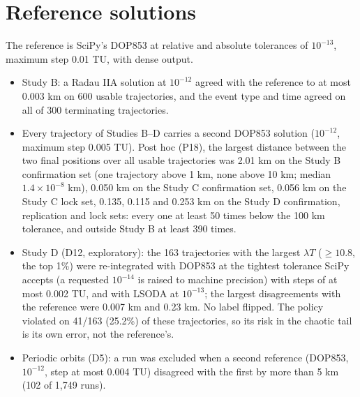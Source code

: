 \documentclass[10pt,letterpaper]{article}
\begin{document}
\section{Reference solutions}
\label{sec:refs}
The reference is SciPy's DOP853 at relative and absolute tolerances of $10^{-13}$, maximum step 0.01 TU, with dense output.
\begin{itemize}
\item Study B: a Radau IIA solution at $10^{-12}$ agreed with the reference to at most 0.003 km on 600 usable trajectories, and the event type and
time agreed on all of 300 terminating trajectories.
\item Every trajectory of Studies B--D carries a second DOP853 solution ($10^{-12}$, maximum step 0.005 TU). Post hoc (P18), the largest distance
between the two final positions over all usable trajectories was 2.01 km on the Study B confirmation set (one trajectory above 1 km, none above
10 km; median $1.4\times10^{-8}$ km), 0.050 km on the Study C confirmation set, 0.056 km on the Study C lock set, 0.135, 0.115 and 0.253 km on the
Study D confirmation, replication and lock sets: every one at least 50 times below the 100 km tolerance, and outside Study B at least 390 times.
\item Study D (D12, exploratory): the 163 trajectories with the largest $\lambda T$ ($\ge 10.8$, the top 1\%) were re-integrated with DOP853 at the
tightest tolerance SciPy accepts (a requested $10^{-14}$ is raised to machine precision) with steps of at most 0.002 TU, and with LSODA at $10^{-13}$;
the largest disagreements with the reference were 0.007 km and 0.23 km. No label flipped. The policy violated on 41/163 (25.2\%) of these
trajectories, so its risk in the chaotic tail is its own error, not the reference's.
\item Periodic orbits (D5): a run was excluded when a second reference (DOP853, $10^{-12}$, step at most 0.004 TU) disagreed with the first by more than
5 km (102 of 1,749 runs).
\end{itemize}
\end{document}
